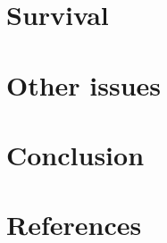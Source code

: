 \documentclass[a4paper]{proc}
\begin{document}


  \section{Survival}


  \section{Other issues}


  \section{Conclusion}

  \section*{References}
  \printbibliography
\end{document}
